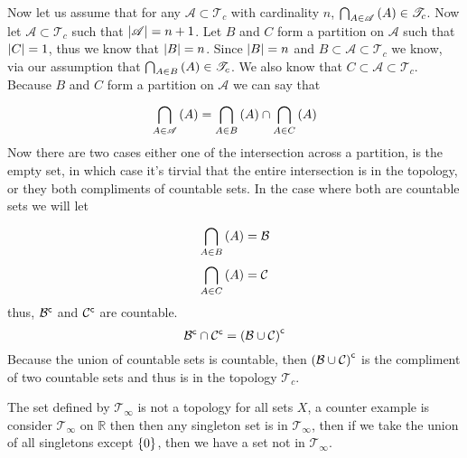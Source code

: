 \documentclass{article}
\begin{document}
Now let us assume that for any $\mathscr A \subset \mathscr T_c$ with cardinality $n$, $\bigcap_{A\in\mathscr A}^{} \left( {A} \right)\in\mathscr T_c$. Now let $\mathscr A \subset \mathscr T_c$ such that $\left| \mathscr A \right| = n+1$. Let $B$ and $C$ form a partition on $\mathscr A$ such that $\left| C \right| = 1$, thus we know that $\left| B \right| = n$. Since $\left| B \right| = n$ and $B \subset \mathscr A \subset \mathscr T_c$ we know, via our assumption that $\bigcap_{A\in B}^{} \left( {A} \right)\in\mathscr T_c$. We also know that $C \subset \mathscr A \subset \mathscr T_c$. Because $B$ and $C$ form a partition on $\mathscr A$ we can say that \[\bigcap_{A\in\mathscr A}^{} \left( {A} \right) = \bigcap_{A\in B}^{} \left( {A} \right) \cap \bigcap_{A\in C}^{} \left( {A} \right)\] Now there are two cases either one of the intersection across a partition, is the empty set, in which case it's tirvial that the entire intersection is in the topology, or they both compliments of countable sets. In the case where both are countable sets we will let \begin{align*}\bigcap_{A\in B}^{} \left( {A} \right) &= \mathcal B\\\bigcap_{A\in C}^{} \left( {A} \right)&=\mathcal C\end{align*} thus, ${\mathcal B}^{\mathsf{c}}$ and ${\mathcal C}^{\mathsf{c}}$ are countable.\[{\mathcal B}^{\mathsf{c}} \cap {\mathcal C}^{\mathsf{c}} = {\left(\mathcal B \cup \mathcal C\right)}^{\mathsf{c}}\] Because the union of countable sets is countable, then ${\left(\mathcal B \cup \mathcal C\right)}^{\mathsf{c}}$ is the compliment of two countable sets and thus is in the topology $\mathscr T_c$.

The set defined by $\mathscr T_\infty$ is not a topology for all sets $X$, a counter example is consider $\mathscr T_\infty$ on $\mathbb R$ then then any singleton set is in $\mathscr T_\infty$, then if we take the union of all singletons except $\left\{ {0} \right\}$, then we have a set not in $\mathscr T_\infty$.



\end{document}
